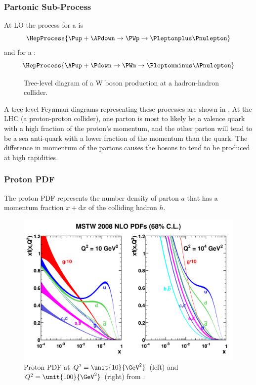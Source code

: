 \subsubsection*{Partonic Sub-Process}

At \ac{LO} the process for a \PWp is
\begin{equation}
  \HepProcess{\Pup + \APdown \to \PWp \to \Pleptonplus \Pnulepton} 
  \label{wbos:wpprod} 
\end{equation}
and for a \PWm:
\begin{equation}
  \HepProcess{\APup + \Pdown \to \PWm \to \Pleptonminus \APnulepton}
  \label{wbos:wmprod} 
\end{equation}


\begin{figure}[htbp]
  \centering
  \caption{Tree-level diagram of a W boson production at a hadron-hadron collider.}
  \label{wbos:feynman}
\end{figure}

A tree-level Feynman diagrams representing these processes are shown in
.
At the \ac{LHC} (a proton-proton collider), one parton is most to likely be a
valence quark with a high fraction of the proton's momentum, and the other
parton will tend to be a sea anti-quark with a lower fraction of the momentum
than the quark. The difference in momentum of the partons causes the \PW bosons 
to tend to be produced at high rapidities. 

\subsubsection*{Proton \acl{PDF}} 
The proton \ac{PDF} represents the number density of parton $a$ that has a momentum
fraction $x+\mathrm{d}x$ of the colliding hadron $h$.  


\begin{figure}[htbp]
  \centering
  \includegraphics[width=\textwidth]{mstw2008nlo68cl_allpdfs}
  \caption{Proton PDF at  $ Q^2 = \unit{ 10  }{\GeV^2} $ (left) 
                      and $ Q^2 = \unit{ 100  }{\GeV^2} $ (right) 
                     from \cite{Martin:2009iq}. }
  \label{wbos:pdf}
\end{figure}

